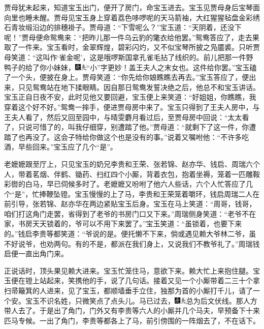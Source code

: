 贾母犹未起来，知道宝玉出门，便开了房门，命宝玉进去。宝玉见贾母身后宝琴面向里也睡未醒。贾母见宝玉身上穿着荔色哆啰呢的天马箭袖，大红猩猩毡盘金彩绣石青妆缎沿边的排穗褂子。贾母道：``下雪呢么？''宝玉道：``天阴着，还没下呢！''贾母便命鸳鸯来：``把昨儿那一件乌云豹的氅衣给他罢。''鸳鸯答应了，走去果取了一件来。宝玉看时，金翠辉煌，碧彩闪灼，又不似宝琴所披之凫靥裘。只听贾母笑道：``这叫作`雀金呢'，这是哦啰斯国拿孔雀毛拈了线织的。前儿把那一件野鸭子的给了你小妹妹，{\includegraphics[width=3mm]{../Images/00004}\includegraphics[width=3mm]{../Images/00012}\footnotesize \kaishu ``小''字更妙！盖王夫人之末女也。}这件给你罢。''宝玉磕了一个头，便披在身上。贾母笑道：``你先给你娘瞧瞧去再去。''宝玉答应了，便出来，只见鸳鸯站在地下揉眼睛。因自那日鸳鸯发誓决绝之后，他总不和宝玉讲话。宝玉正自日夜不安，此时见他又要回避，宝玉便上来笑道：``好姐姐，你瞧瞧，我穿着这个好不好。''鸳鸯一摔手，便进贾母房中来了。宝玉只得到了王夫人房中，与王夫人看了，然后又回至园中，与晴雯麝月看过后，至贾母房中回说：``太太看了，只说可惜了的，叫我仔细穿，别遭踏了他。''贾母道：``就剩下了这一件，你遭踏了也再没了。这会子特给你做这个也是没有的事。''说着又嘱咐他：``不许多吃酒，早些回来。''宝玉应了几个``是''。

老嬷嬷跟至厅上，只见宝玉的奶兄李贵和王荣、张若锦、赵亦华、钱启、周瑞六个人，带着茗烟、伴鹤、锄药、扫红四个小厮，背着衣包，抱着坐褥，笼着一匹雕鞍彩辔的白马，早已伺候多时了。老嬷嬷又吩咐了他六人些话，六个人忙答应了几个``是''，忙捧鞭坠镫。宝玉慢慢的上了马，李贵和王荣笼着嚼环，钱启周瑞二人在前引导，张若锦、赵亦华在两边紧贴宝玉后身。宝玉在马上笑道：``周哥，钱哥，咱们打这角门走罢，省得到了老爷的书房门口又下来。''周瑞侧身笑道：``老爷不在家，书房天天锁着的，爷可以不用下来罢了。''宝玉笑道：``虽锁着，也要下来的。''钱启李贵等都笑道：``爷说的是。便托懒不下来，倘或遇见赖大爷林二爷，虽不好说爷，也劝两句。有的不是，都派在我们身上，又说我们不教爷礼了。''周瑞钱启便一直出角门来。

正说话时，顶头果见赖大进来。宝玉忙笼住马，意欲下来。赖大忙上来抱住腿。宝玉便在镫上站起来，笑携他的手，说了几句话。接着又见一个小厮带着二三十个拿扫帚簸箕的人进来，见了宝玉，都顺墙垂手立住，独那为首的小厮打千儿，请了一个安。宝玉不识名姓，只微笑点了点头儿。马已过去，{\includegraphics[width=3mm]{../Images/00004}\includegraphics[width=3mm]{../Images/00012}\footnotesize \kaishu 总为后文伏线。}那人方带人去了。于是出了角门，门外又有李贵等六人的小厮并几个马夫，早预备下十来匹马专候。一出了角门，李贵等都各上了马，前引傍围的一阵烟去了，不在话下。

